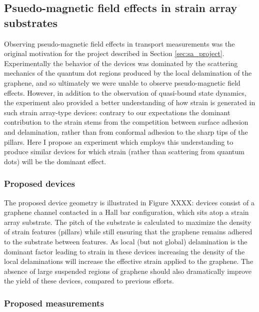 \documentclass[edeposit,fullpage,draftthesis]{uiucthesis2009}
\begin{document}
        
    \subsection{Psuedo-magnetic field effects in strain array substrates}
        
            Observing pseudo-magnetic field effects in transport measurements was the original motivation
            for the project described in Section \ref{sec:sa_project}. Experimentally the behavior of the
            devices was dominated by the scattering mechanics of the quantum dot regions produced by 
            the local delamination of the graphene, and so ultimately we were unable to observe pseudo-magnetic
            field effects. However, in addition to the observation of quasi-bound state dynamics, the experiment
            also provided a better understanding of how strain is generated in such strain array-type devices: 
            contrary to our expectations the dominant contribution to the strain stems from the 
            competition between surface adhesion and delamination, rather than from conformal adhesion to the sharp
            tips of the pillars.
            Here I propose an experiment which employs this understanding to produce similar devices for which strain
            (rather than scattering from quantum dots) will be the dominant effect.
            
            \subsubsection*{Proposed devices}
            
            The proposed device geometry is illustrated in Figure XXXX: devices consist of 
            a graphene channel contacted in a Hall bar configuration, which
            sits atop a strain array substrate. The pitch of the substrate is calculated to 
            maximize the density of strain features (pillars) while still ensuring that the 
            graphene remains adhered to the substrate between features. As local (but not global)
            delamination is the dominant factor leading to strain in these devices increasing
            the density of the local delaminations will increase the effective strain applied to
            the graphene. 
            The absence of large suspended regions of graphene should also dramatically improve
            the yield of these devices, compared to previous efforts.
            
            \subsubsection*{Proposed measurements}
\end{document}
